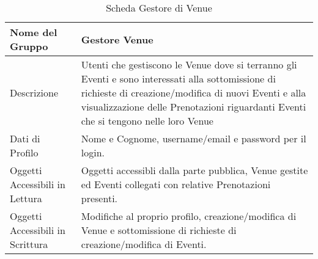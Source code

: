 \begin{table}[H]
    \begin{center}  
        \begin{tabular}{ | l | p{10cm} |} %
        \hline
        \textbf{Nome del Gruppo} & \textbf{Gestore Venue}\\ \hline  
           
        Descrizione & Utenti che gestiscono le Venue dove si terranno gli Eventi e sono interessati alla sottomissione di richieste di creazione/modifica di nuovi Eventi e alla visualizzazione delle Prenotazioni riguardanti Eventi che si tengono nelle loro Venue\\ \hline  
           
        Dati di Profilo & Nome e Cognome, username/email e password per il login.\\ \hline  
           
        Oggetti Accessibili in Lettura & Oggetti accessibli dalla parte pubblica, Venue gestite ed Eventi collegati con relative Prenotazioni presenti.\\ \hline  
           
        Oggetti Accessibili in Scrittura & Modifiche al proprio profilo, creazione/modifica di Venue e sottomissione di richieste di creazione/modifica di Eventi.\\ \hline  
           
        \end{tabular}  
        \caption{Scheda Gestore di Venue}
    \end{center}  
\end{table}